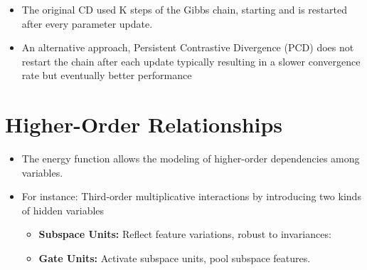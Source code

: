 \documentclass{antclass}
\begin{document}
%
%	
%	

\pagebreak

\begin{itemize}

	\item The original CD used K steps of the Gibbs chain, starting and is restarted after every parameter
	update.
	\item An alternative approach, Persistent Contrastive Divergence (PCD)
	does not restart the chain after each update
	typically resulting in a slower
	convergence rate but eventually better performance 
\end{itemize}

\section{Higher-Order Relationships }

\begin{itemize}
	\item The energy function allows the modeling of
	higher-order dependencies among variables.
	\item For instance: Third-order multiplicative interactions by introducing two kinds of hidden	variables
	\begin{itemize}
		\item \textbf{Subspace Units:} Reflect feature variations, robust to invariances:
		\item \textbf{Gate Units:} Activate subspace units, pool subspace features.
	\end{itemize}
\end{itemize}
\end{document}
